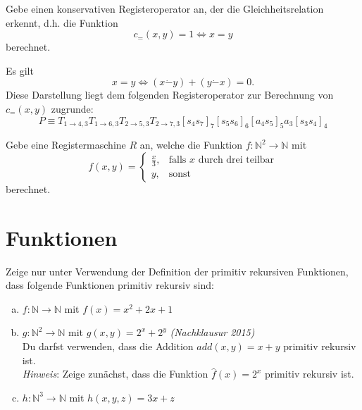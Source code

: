 \documentclass[german,headsepline]{scrartcl}
\theoremstyle{definition}
\begin{document}
	\begin{question}[subtitle={Nachklausur 2015}]
		Gebe einen konservativen Registeroperator an,
		der die Gleichheitsrelation erkennt, d.h. die Funktion
		\[c_=(x,y)=1\Leftrightarrow x=y\]
		berechnet.
	\end{question}
	\begin{solution}
		Es gilt
		\[x=y\Leftrightarrow (x\dot{-}y)+(y\dot{-}x)=0.\]
		Diese Darstellung liegt dem folgenden Registeroperator zur Berechnung von $c_=(x,y)$ zugrunde:
		\[P\equiv T_{1\to4,3}T_{1\to6,3}T_{2\to5,3}T_{2\to7,3}[s_4s_7]_7[s_5s_6]_6[a_4s_5]_5a_3[s_3s_4]_4\]
	\end{solution}
	
	\begin{question}[subtitle={Blatt 13, 2015}]
		Gebe eine Registermaschine $R$ an, welche die Funktion $f:\mathbb{N}^2\to\mathbb{N}$ mit
		\[f(x,y)=\begin{cases}
			\frac{x}{3}, &\text{falls $x$ durch drei teilbar} \\
			y, &\text{sonst}
		\end{cases}\]
		berechnet.
	\end{question}
	
	\newpage
	\section{Funktionen}
	\begin{question}
		Zeige nur unter Verwendung der Definition der primitiv rekursiven Funktionen,
		dass folgende Funktionen primitiv rekursiv sind:
		\begin{enumerate}[(a)]
			\item $f:\mathbb{N}\to\mathbb{N}$ mit $f(x)=x^2+2x+1$
			\item $g:\mathbb{N}^2\to\mathbb{N}$ mit $g(x,y)=2^x+2^y$
				\hfill\textit{(Nachklausur 2015)} \\
				Du darfst verwenden, dass die Addition $add(x,y)=x+y$ primitiv rekursiv ist. \\
				\textit{Hinweis}: Zeige zunächst, dass die Funktion $\hat{f}(x)=2^x$ primitiv rekursiv ist.
			\item $h:\mathbb{N}^3\to\mathbb{N}$ mit $h(x,y,z)=3x+z$
		\end{enumerate}
	\end{question}
	
\end{document}
